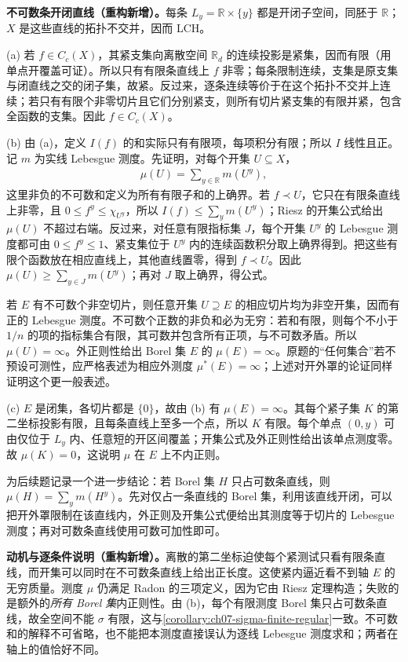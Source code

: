 \documentclass[../../main.tex]{subfiles}
\begin{document}
\begin{solution}
\textbf{不可数条开闭直线（重构新增）。}每条 $L_y=\mathbb R\times\{y\}$ 都是开闭子空间，同胚于 $\mathbb R$；$X$ 是这些直线的拓扑不交并，因而 LCH。

(a) 若 $f\in C_c(X)$，其紧支集向离散空间 $\mathbb R_d$ 的连续投影是紧集，因而有限（用单点开覆盖可证）。所以只有有限条直线上 $f$ 非零；每条限制连续，支集是原支集与闭直线之交的闭子集，故紧。反过来，逐条连续等价于在这个拓扑不交并上连续；若只有有限个非零切片且它们分别紧支，则所有切片紧支集的有限并紧，包含全函数的支集。因此 $f\in C_c(X)$。

(b) 由 (a)，定义 $I(f)$ 的和实际只有有限项，每项积分有限；所以 $I$ 线性且正。记 $m$ 为实线 Lebesgue 测度。先证明，对每个开集 $U\subseteq X$，
\begin{align*}
\mu(U)=\sum_{y\in\mathbb R}m(U^y),
\end{align*}
这里非负的不可数和定义为所有有限子和的上确界。若 $f\prec U$，它只在有限条直线上非零，且 $0\leqslant f^y\leqslant\chi_{U^y}$，所以 $I(f)\leqslant\sum_y m(U^y)$；Riesz 的开集公式给出 $\mu(U)$ 不超过右端。反过来，对任意有限指标集 $J$，每个开集 $U^y$ 的 Lebesgue 测度都可由 $0\leqslant f^y\leqslant1$、紧支集位于 $U^y$ 内的连续函数积分取上确界得到。把这些有限个函数放在相应直线上，其他直线置零，得到 $f\prec U$。因此 $\mu(U)\geqslant\sum_{y\in J}m(U^y)$；再对 $J$ 取上确界，得公式。

若 $E$ 有不可数个非空切片，则任意开集 $U\supseteq E$ 的相应切片均为非空开集，因而有正的 Lebesgue 测度。不可数个正数的非负和必为无穷：若和有限，则每个不小于 $1/n$ 的项的指标集合有限，其可数并包含所有正项，与不可数矛盾。所以 $\mu(U)=\infty$。外正则性给出 Borel 集 $E$ 的 $\mu(E)=\infty$。原题的“任何集合”若不预设可测性，应严格表述为相应外测度 $\mu^*(E)=\infty$；上述对开外罩的论证同样证明这个更一般表述。

(c) $E$ 是闭集，各切片都是 $\{0\}$，故由 (b) 有 $\mu(E)=\infty$。其每个紧子集 $K$ 的第二坐标投影有限，且每条直线上至多一个点，所以 $K$ 有限。每个单点 $(0,y)$ 可由仅位于 $L_y$ 内、任意短的开区间覆盖；开集公式及外正则性给出该单点测度零。故 $\mu(K)=0$，这说明 $\mu$ 在 $E$ 上不内正则。

为后续题记录一个进一步结论：若 Borel 集 $H$ 只占可数条直线，则 $\mu(H)=\sum_y m(H^y)$。先对仅占一条直线的 Borel 集，利用该直线开闭，可以把开外罩限制在该直线内，外正则及开集公式便给出其测度等于切片的 Lebesgue 测度；再对可数条直线使用可数可加性即可。
\end{solution}
\begin{remark}
\textbf{动机与逐条件说明（重构新增）。}离散的第二坐标迫使每个紧测试只看有限条直线，而开集可以同时在不可数条直线上给出正长度。这使紧内逼近看不到轴 $E$ 的无穷质量。测度 $\mu$ 仍满足 Radon 的三项定义，因为它由 Riesz 定理构造；失败的是额外的\emph{所有 Borel 集}内正则性。由 (b)，每个有限测度 Borel 集只占可数条直线，故全空间不能 $\sigma$ 有限，这与\cref{corollary:ch07-sigma-finite-regular}一致。不可数和的解释不可省略，也不能把本测度直接误认为逐线 Lebesgue 测度求和；两者在轴上的值恰好不同。
\end{remark}
\end{document}
